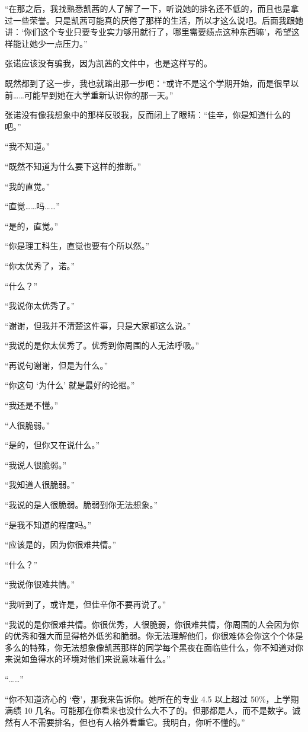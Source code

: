 \documentclass[UTF8]{ctexart}
\begin{document}
“在那之后，我找熟悉凯茜的人了解了一下，听说她的排名还不低的，而且也是拿过一些荣誉。只是凯茜可能真的厌倦了那样的生活，所以才这么说吧。后面我跟她讲：‘你们这个专业只要专业实力够用就行了，哪里需要绩点这种东西嘛’，希望这样能让她少一点压力。”

张诺应该没有骗我，因为凯茜的文件中，也是这样写的。

既然都到了这一步，我也就踏出那一步吧：“或许不是这个学期开始，而是很早以前……可能早到她在大学重新认识你的那一天。”

张诺没有像我想象中的那样反驳我，反而闭上了眼睛：“佳辛，你是知道什么的吧。”

“我不知道。”

“既然不知道为什么要下这样的推断。”

“我的直觉。”

“直觉……吗……”

“是的，直觉。”

“你是理工科生，直觉也要有个所以然。”

“你太优秀了，诺。”

“什么？”

“我说你太优秀了。”

“谢谢，但我并不清楚这件事，只是大家都这么说。”

“我说的是你太优秀了。优秀到你周围的人无法呼吸。”

“再说句谢谢，但是为什么。”

“你这句 ‘为什么’ 就是最好的论据。”

“我还是不懂。”

“人很脆弱。”

“是的，但你又在说什么。”

“我说人很脆弱。”

“我知道人很脆弱。”

“我说的是人很脆弱。脆弱到你无法想象。”

“是我不知道的程度吗。”

“应该是的，因为你很难共情。”

“什么？”

“我说你很难共情。”

“我听到了，或许是，但佳辛你不要再说了。”

“我说的是你很难共情。你很优秀，人很脆弱，你很难共情，你周围的人会因为你的优秀和强大而显得格外低劣和脆弱。你无法理解他们，你很难体会你这个个体是多么的特殊，你无法想象像凯茜那样的同学每个黑夜在面临些什么，你不知道对你来说如鱼得水的环境对他们来说意味着什么。”

“……”

“你不知道济心的 ‘卷’，那我来告诉你。她所在的专业 4.5 以上超过 50\%，上学期满绩 10 几名。可能那在你看来也没什么大不了的。但那都是人，而不是数字。诚然有人不需要排名，但也有人格外看重它。我明白，你听不懂的。”
\end{document}
